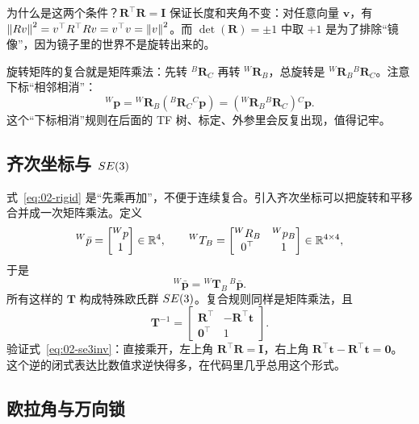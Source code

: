 为什么是这两个条件？$\bm{R}^{\top}\bm{R}=\bm{I}$ 保证长度和夹角不变：对任意向量 $\bm{v}$，有 $\left\lVert Rv \right\rVert^{2}=v^{\top}R^{\top}Rv=v^{\top}v=\left\lVert v \right\rVert^{2}$。而 $\det(\bm{R})=\pm1$ 中取 $+1$ 是为了排除“镜像”，因为镜子里的世界不是旋转出来的。

旋转矩阵的复合就是矩阵乘法：先转 ${}^{B}\bm{R}_{C}$ 再转 ${}^{W}\bm{R}_{B}$，总旋转是 ${}^{W}\bm{R}_{B}{}^{B}\bm{R}_{C}$。注意下标“相邻相消”：
\begin{equation}
{}^{W}\bm{p}={}^{W}\bm{R}_{B}\left({}^{B}\bm{R}_{C}{}^{C}\bm{p}\right)
=\left({}^{W}\bm{R}_{B}{}^{B}\bm{R}_{C}\right){}^{C}\bm{p}.
\end{equation}
这个“下标相消”规则在后面的 TF 树、标定、外参里会反复出现，值得记牢。

\subsection{齐次坐标与 $SE(3)$}

式~\eqref{eq:02-rigid} 是“先乘再加”，不便于连续复合。引入齐次坐标可以把旋转和平移合并成一次矩阵乘法。定义
\begin{equation}
{}^{W}\bar{p}=\begin{bmatrix}{}^{W}p\\1\end{bmatrix}\in\mathbb{R}^{4},\qquad
{}^{W}T_{B}=\begin{bmatrix}{}^{W}R_{B}&{}^{W}p_{B}\\0^{\top}&1\end{bmatrix}\in\mathbb{R}^{4\times4},
\end{equation}
于是
\begin{equation}
{}^{W}\bar{\bm{p}}={}^{W}\bm{T}_{B}\,{}^{B}\bar{\bm{p}}.
\end{equation}
所有这样的 $\bm{T}$ 构成特殊欧氏群 $SE(3)$。复合规则同样是矩阵乘法，且
\begin{equation}
\bm{T}^{-1}=\begin{bmatrix}\bm{R}^{\top}&-\bm{R}^{\top}\bm{t}\\\bm{0}^{\top}&1\end{bmatrix}.
\label{eq:02-se3inv}
\end{equation}
验证式~\eqref{eq:02-se3inv}：直接乘开，左上角 $\bm{R}^{\top}\bm{R}=\bm{I}$，右上角 $\bm{R}^{\top}\bm{t}-\bm{R}^{\top}\bm{t}=\bm{0}$。这个逆的闭式表达比数值求逆快得多，在代码里几乎总用这个形式。

\subsection{欧拉角与万向锁}

